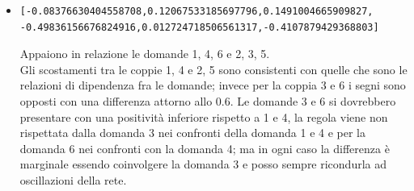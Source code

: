 \begin{itemize}
\item \begin{verbatim}[-0.08376630404558708,0.12067533185697796,0.1491004665909827,
-0.49836156676824916,0.012724718506561317,-0.4107879429368803]
\end{verbatim}
Appaiono in relazione le domande 1, 4, 6 e 2, 3, 5.\\
Gli scostamenti tra le coppie 1, 4 e 2, 5 sono consistenti con quelle che sono le relazioni di dipendenza fra le domande; invece per la coppia 3 e 6 i segni sono opposti con una differenza  attorno allo 0.6.
Le domande 3 e 6 si dovrebbero presentare con una positivit\`a inferiore rispetto a 1 e 4, la regola viene non rispettata dalla domanda 3 nei confronti della domanda 1 e 4 e per la domanda 6 nei confronti con la domanda 4; ma in ogni caso la differenza \`e marginale  essendo coinvolgere la domanda 3 e posso sempre ricondurla ad oscillazioni della rete.
\end{itemize}


